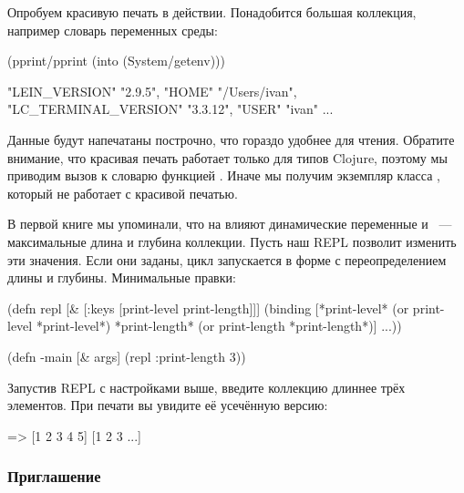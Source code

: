 Опробуем красивую печать в действии. Понадобится большая коллекция, например словарь переменных среды:

\pagebreaklarge

\begin{english}
  \begin{clojure}
(pprint/pprint
  (into {} (System/getenv)))

{"LEIN_VERSION" "2.9.5",
 "HOME" "/Users/ivan",
 "LC_TERMINAL_VERSION" "3.3.12",
 "USER" "ivan"
 ...
 }
  \end{clojure}
\end{english}

Данные будут напечатаны построчно, что гораздо удобнее для чтения. Обратите внимание, что красивая печать работает только для типов Clojure, поэтому мы приводим вызов  к словарю функцией . Иначе мы получим экземпляр класса , который не работает с красивой печатью.


В первой книге мы упоминали, что на  влияют динамические переменные  и ~--- максимальные длина и глубина коллекции. Пусть наш REPL позволит изменить эти значения. Если они заданы, цикл запускается в форме  с переопределением длины и глубины. Минимальные правки:

\begin{english}
  \begin{clojure}
(defn repl [& [{:keys [print-level
                       print-length]}]]
  (binding [*print-level*
            (or print-level *print-level*)
            *print-length*
            (or print-length *print-length*)]
    ...))

(defn -main [& args]
  (repl {:print-length 3}))
  \end{clojure}
\end{english}

Запустив REPL с настройками выше, введите коллекцию длиннее трёх элементов. При печати вы увидите её усечённую версию:

\begin{english}
  \begin{clojure}
=> [1 2 3 4 5]
[1 2 3 ...]
  \end{clojure}
\end{english}

\subsubsection{Приглашение}

